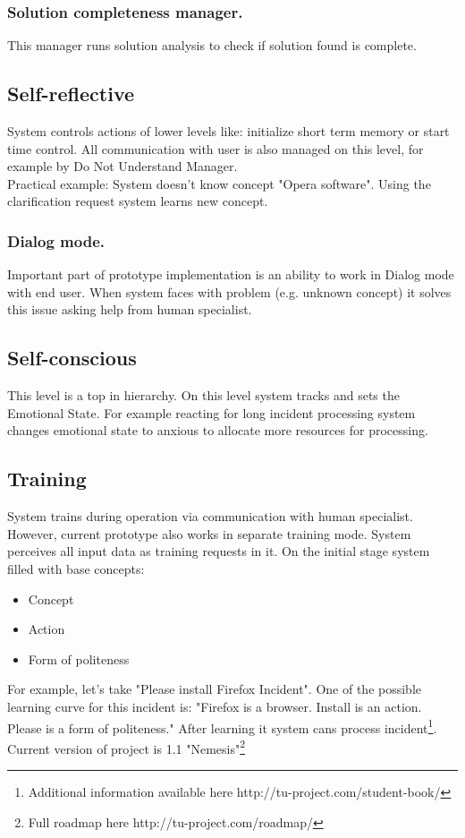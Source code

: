 \documentclass[runningheads,a4paper]{llncs}
\begin{document}
\subsubsection{Solution completeness manager.} This manager runs solution analysis to check if solution found is complete.

\subsection{Self-reflective}
System controls actions of lower levels like: initialize short term memory or start time control. All communication with user is also managed on this level, for example by Do Not Understand Manager.\\
Practical example: System doesn't know concept "Opera software". Using the clarification request system learns new concept.

\subsubsection{Dialog mode.}
Important part of prototype implementation is an ability to work in Dialog mode with end user. When system faces with problem (e.g. unknown concept) it solves this issue asking help from human specialist.

\subsection{Self-conscious}
This level is a top in hierarchy. On this level system tracks and sets the Emotional State. For example reacting for long incident processing system changes emotional state to anxious to allocate more resources for processing.

\subsection{Training}
System trains during operation via communication with human specialist. However, current prototype also works in separate training mode. System perceives all input data as training requests in it. On the initial stage system filled with base concepts:
\begin{itemize}
 \item Concept
 \item Action
 \item Form of politeness
\end{itemize}

For example, let's take "Please install Firefox Incident". One of the possible learning curve for this incident is: "Firefox is a browser. Install is an action. Please is a form of politeness." After learning it system cans process incident\footnote{Additional information available here http://tu-project.com/student-book/}. Current version of project is 1.1 "Nemesis"\footnote{Full roadmap here http://tu-project.com/roadmap/}
\end{document}
